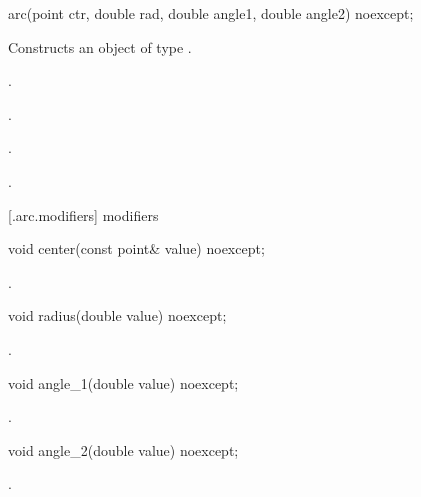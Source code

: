 \begin{itemdecl}
    arc(point ctr, double rad, double angle1, double angle2) noexcept;
\end{itemdecl}
\begin{itemdescr}
	\pnum
	\effects
	Constructs an object of type .
	
	\pnum
	\postconditions
	.

	.

	.

	.

\end{itemdescr}

 [\iotwod.arc.modifiers]{ modifiers}

\begin{itemdecl}
    void center(const point& value) noexcept;
\end{itemdecl}
\begin{itemdescr}
	\pnum
	\postconditions
	.
	
\end{itemdescr}

\begin{itemdecl}
    void radius(double value) noexcept;
\end{itemdecl}
\begin{itemdescr}
	\pnum
	\postconditions
	.
	
\end{itemdescr}

\begin{itemdecl}
    void angle_1(double value) noexcept;
\end{itemdecl}
\begin{itemdescr}
	\pnum
	\postconditions
	.
	
\end{itemdescr}

\begin{itemdecl}
    void angle_2(double value) noexcept;
\end{itemdecl}
\begin{itemdescr}
	\pnum
	\postconditions
	.
	
\end{itemdescr}

